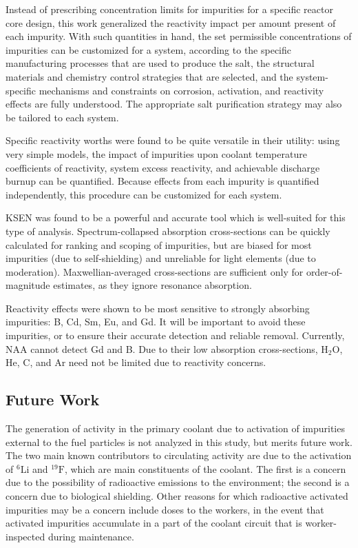 \documentclass[11pt]{article}
\newcommand{\iso}[2]{$^{#2}\mathrm{#1}$}
\newcommand{\water}[0]{$\mathrm{H_2O}$}
\begin{document}
Instead of prescribing concentration limits for impurities for a specific reactor core design, this work generalized the reactivity impact per amount present of each impurity.
With such quantities in hand, the set permissible concentrations of impurities can be customized for a system, according to the specific manufacturing processes that are used to produce the salt, the structural materials and chemistry control strategies that are selected, and the system-specific mechanisms and constraints on corrosion, activation, and reactivity effects are fully understood.
The appropriate salt purification strategy may also be tailored to each system.

Specific reactivity worths were found to be quite versatile in their utility: using very simple models, the impact of impurities upon coolant temperature coefficients of reactivity, system excess reactivity, and achievable discharge burnup can be quantified.
Because effects from each impurity is quantified independently, this procedure can be customized for each system.

KSEN was found to be a powerful and accurate tool which is well-suited for this type of analysis.
Spectrum-collapsed absorption cross-sections can be quickly calculated for ranking and scoping of impurities, but are biased for most impurities (due to self-shielding) and unreliable for light elements (due to moderation).
Maxwellian-averaged cross-sections are sufficient only for order-of-magnitude estimates, as they ignore resonance absorption.

Reactivity effects were shown to be most sensitive to strongly absorbing impurities: B, Cd, Sm, Eu, and Gd.
It will be important to avoid these impurities, or to ensure their accurate detection and reliable removal.
Currently, NAA cannot detect Gd and B.
Due to their low absorption cross-sections, \water{}, He, C, and Ar need not be limited due to reactivity concerns.

\subsection{Future Work}

The generation of activity in the primary coolant due to activation of impurities external to the fuel particles is not analyzed in this study, but merits future work.
The two main known contributors to circulating activity are due to the activation of \iso{Li}{6} and \iso{F}{19}, which are main constituents of the coolant.
The first is a concern due to the possibility of radioactive emissions to the environment; the second is a concern due to biological shielding.
Other reasons for which radioactive activated impurities may be a concern include doses to the workers, in the event that activated impurities accumulate in a part of the coolant circuit that is worker-inspected during maintenance.
\end{document}
